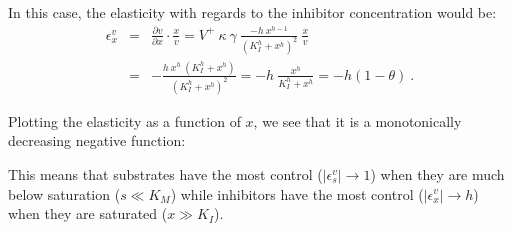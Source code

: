 \documentclass[12pt,a4paper]{article}
\begin{document}
In this case, the elasticity with regards to the inhibitor concentration would be:
\begin{eqnarray}
    \epsilon_x^v &=& \frac{\partial v}{\partial x}\cdot\frac{x}{v} = V^+ ~ \kappa ~ \gamma ~ \frac{- h ~ x^{h-1}}{(K_I^h + x^h)^2} ~ \frac{x}{v} \nonumber \\
    &=& -\frac{h ~ x^h ~ (K_I^h + x^h)}{(K_I^h + x^h)^2} = -h ~ \frac{x^h}{K_I^h + x^h} = -h (1 - \theta)~. \label{eq:eps_inh}
\end{eqnarray}

Plotting the elasticity as a function of $x$, we see that it is a monotonically decreasing negative function:

\begin{center}
\end{center}

This means that substrates have the most control ($|\epsilon_s^v| \rightarrow 1$) when they are much below saturation ($s \ll K_M$) while inhibitors have the most control ($|\epsilon_x^v| \rightarrow h$) when they are saturated ($x \gg K_I$).
\end{document}
